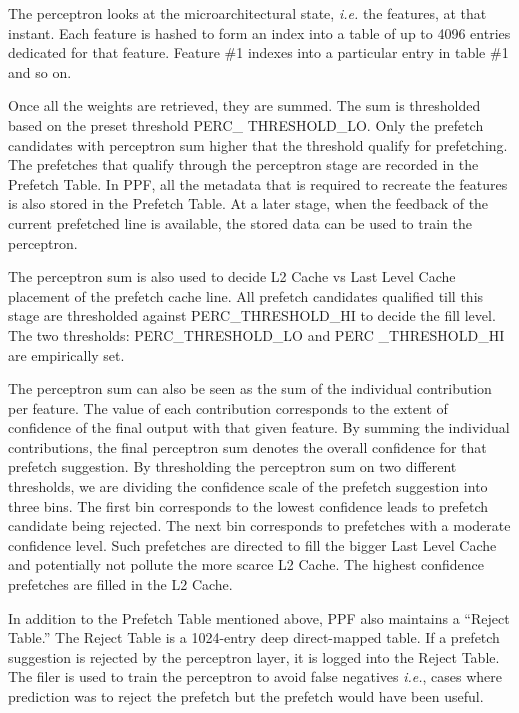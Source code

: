 The perceptron looks at the microarchitectural state, {\em i.e.} the features,
at that instant.  Each feature is hashed to form an index into a table of up to 
4096 entries dedicated for that feature.  
Feature \#1 indexes into a particular entry in table \#1 and so on.

Once all the weights are retrieved, they are summed.  The sum is thresholded
based on the preset threshold PERC\_ THRESHOLD\_LO.  Only the prefetch
candidates with perceptron sum higher that the threshold qualify for
prefetching.  The prefetches that qualify through the perceptron 
stage are recorded in the Prefetch Table.  In PPF, all the metadata that is required
to recreate the features is also stored in the Prefetch Table.  At a later
stage, when the feedback of the current prefetched line is available, the
stored data can be used to train the perceptron.

The perceptron sum is also used to decide L2 Cache vs Last Level Cache
placement of the prefetch cache line.  All prefetch candidates qualified till
this stage are thresholded against PERC\_THRESHOLD\_HI to decide the fill
level. The two thresholds: PERC\_THRESHOLD\_LO and PERC \_THRESHOLD\_HI are
empirically set.

The perceptron sum can also be seen as the sum of the individual contribution
per feature.  The value of each contribution corresponds to the extent of
confidence of the final output with that given feature.  By summing the
individual contributions, the final perceptron sum denotes the overall
confidence for that prefetch suggestion.  By thresholding the perceptron sum
on two different thresholds, we are dividing the confidence scale of the
prefetch suggestion into three bins.  The first bin corresponds to the lowest
confidence leads to prefetch candidate being rejected.  The next bin
corresponds to prefetches with a moderate confidence level.  Such prefetches
are directed to fill the bigger Last Level Cache and potentially not pollute
the more scarce L2 Cache.  The highest confidence prefetches are filled in the
L2 Cache.

In addition to the Prefetch Table mentioned above, PPF also maintains a
``Reject Table.''  The Reject Table is a 1024-entry deep direct-mapped
table.  If a prefetch suggestion is rejected by the perceptron layer, it is
logged into the Reject Table.  The filer is used to train the perceptron to
avoid false negatives \textit{i.e.}, cases where prediction was to reject the
prefetch but the prefetch would have been useful.

